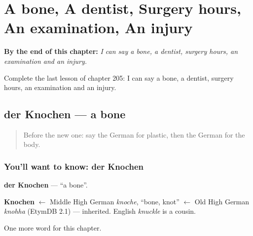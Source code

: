 
\chapter{A bone, A dentist, Surgery hours, An examination, An injury}
\label{ch:ge-a-bone-a-dentist-surgery-hours-an-examination-an-injury}

\begin{chapteropening}
\textbf{By the end of this chapter:} \emph{I can say a bone, a dentist, surgery hours, an examination and an injury.}

Complete the last lesson of chapter 205: I can say a bone, a dentist, surgery hours, an examination and an injury.
\end{chapteropening}

\section[der Knochen]{der Knochen — a bone}

\label{lesson:GE-C205-knochen}



\begin{quote}
Before the new one: say the German for plastic, then the German for the body.
\end{quote}

\subsection*{You'll want to know: der Knochen}
\textbf{der Knochen} — \textquotedblleft{}a bone\textquotedblright{}.

\begin{cousinweb}
\textbf{Knochen} $\leftarrow$ Middle High German \emph{knoche}, \textquotedblleft{}bone, knot\textquotedblright{} $\leftarrow$ Old High German \emph{knohha} (EtymDB 2.1) — inherited. English \emph{knuckle} is a cousin.
\end{cousinweb}

\begin{grammarlens}[title={What you've built}]
One more word for this chapter.
\end{grammarlens}

